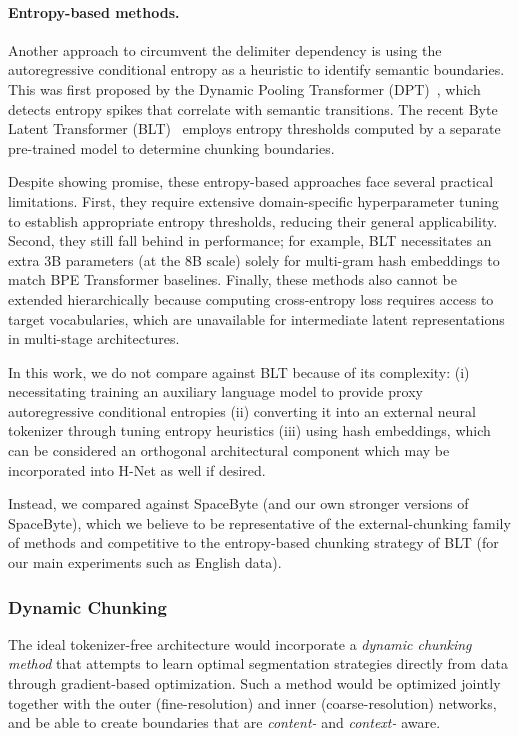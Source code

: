 \documentclass{article}
\newcommand{\citep}{\parencite}
\theoremstyle{plain}
\theoremstyle{remark}
\begin{document}
\paragraph{Entropy-based methods.}
Another approach to circumvent the delimiter dependency is using the autoregressive conditional entropy as a heuristic to identify semantic boundaries.
This was first proposed by the Dynamic Pooling Transformer (DPT)~\citep{DPT}, which detects entropy spikes that correlate with semantic transitions.
The recent Byte Latent Transformer (BLT)~\citep{BLT} employs entropy thresholds computed by a separate pre-trained model to determine chunking boundaries.

Despite showing promise, these entropy-based approaches face several practical limitations.
First, they require extensive domain-specific hyperparameter tuning to establish appropriate entropy thresholds, reducing their general applicability.
Second, they still fall behind in performance; for example, BLT necessitates an extra 3B parameters (at the 8B scale) solely for multi-gram hash embeddings to match BPE Transformer baselines.
Finally, these methods also cannot be extended hierarchically because computing cross-entropy loss requires access to target vocabularies, which are unavailable for intermediate latent representations in multi-stage architectures.

In this work, we do not compare against BLT because of its complexity: (i) necessitating training an auxiliary language model to provide proxy autoregressive conditional entropies (ii) converting it into an external neural tokenizer through tuning entropy heuristics (iii) using hash embeddings, which can be considered an orthogonal architectural component which may be incorporated into H-Net as well if desired.

Instead, we compared against SpaceByte (and our own stronger versions of SpaceByte), which we believe to be representative of the external-chunking family of methods and competitive to the entropy-based chunking strategy of BLT (for our main experiments such as English data).

\subsubsection{Dynamic Chunking}

The ideal tokenizer-free architecture would incorporate a \emph{dynamic chunking method} that attempts to learn optimal segmentation strategies directly from data through gradient-based optimization.
Such a method would be optimized jointly together with the outer (fine-resolution) and inner (coarse-resolution) networks, and be able to create boundaries that are \emph{content-} and \emph{context-} aware.
\end{document}

